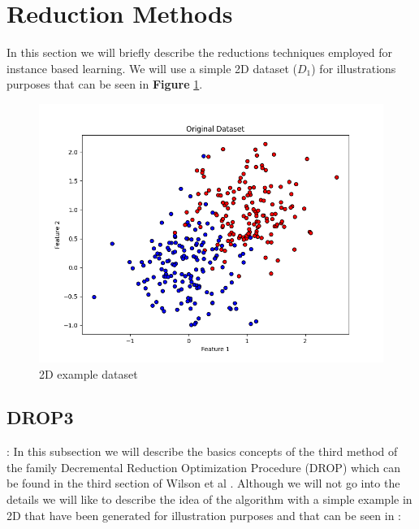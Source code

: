 
\section{Reduction Methods}
In this section we will briefly describe the reductions techniques employed for instance based learning. We will use a simple 2D dataset ($D_1$) for illustrations purposes that can be seen in \textbf{Figure} \ref{fig:2dDatasetReduction}.
\begin{figure}[ht]
    \centering
    \includegraphics[width=\textwidth]{figures/2dDataset} %
    \caption{2D example dataset}
    \label{fig:2dDatasetReduction}
\end{figure}


\subsection{DROP3}:
In this subsection we will describe the basics concepts of the third method of the family Decremental Reduction Optimization Procedure (DROP) which can be found in the third section of Wilson et al \cite{wilson2000reduction}.
Although we will not go into the details we will like to describe the idea of the algorithm with a simple example in 2D that have been generated for illustration purposes and that can be seen in :

